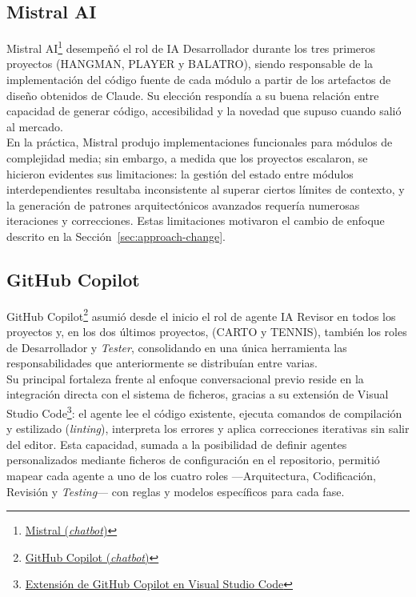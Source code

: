 \subsection{Mistral AI} \label{subsec:mistral}
Mistral AI\footnote{\href{https://chat.mistral.ai/chat}{Mistral (\textit{chatbot})}} desempeñó el rol de \ac{IA} Desarrollador durante los tres primeros proyectos (\ac{HANGMAN}, \ac{PLAYER} y \ac{BALATRO}), siendo responsable de la implementación del código fuente de cada módulo a partir de los artefactos de diseño obtenidos de Claude. Su elección respondía a su buena relación entre capacidad de generar código, accesibilidad y la novedad que supuso cuando salió al mercado.\\

En la práctica, Mistral produjo implementaciones funcionales para módulos de complejidad media; sin embargo, a medida que los proyectos escalaron, se hicieron evidentes sus limitaciones: la gestión del estado entre módulos interdependientes resultaba inconsistente al superar ciertos límites de contexto, y la generación de patrones arquitectónicos avanzados requería numerosas iteraciones y correcciones. Estas limitaciones motivaron el cambio de enfoque descrito en la Sección~\ref{sec:approach-change}.

\subsection{GitHub Copilot} \label{subsec:copilot}

GitHub Copilot\footnote{\href{https://github.com/copilot/agents}{GitHub Copilot (\textit{chatbot})}} asumió desde el inicio el rol de agente \ac{IA} Revisor en todos los proyectos y, en los dos últimos proyectos, (\ac{CARTO} y \ac{TENNIS}), también los roles de Desarrollador y \textit{Tester}, consolidando en una única herramienta las responsabilidades que anteriormente se distribuían entre varias.\\

Su principal fortaleza frente al enfoque conversacional previo reside en la integración directa con el sistema de ficheros, gracias a su extensión de Visual Studio Code\footnote{\href{https://code.visualstudio.com/docs/copilot/overview}{Extensión de GitHub Copilot en Visual Studio Code}}: el agente lee el código existente, ejecuta comandos de compilación y estilizado (\textit{linting}), interpreta los errores y aplica correcciones iterativas sin salir del editor. Esta capacidad, sumada a la posibilidad de definir agentes personalizados mediante ficheros de configuración en el repositorio, permitió mapear cada agente a uno de los cuatro roles ---Arquitectura, Codificación, Revisión y \textit{Testing}--- con reglas y modelos específicos para cada fase.\\

